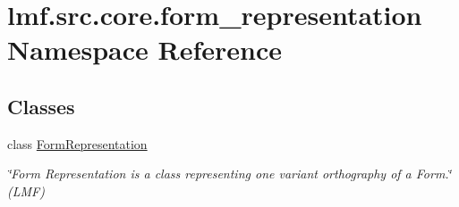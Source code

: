 \hypertarget{namespacelmf_1_1src_1_1core_1_1form__representation}{\section{lmf.\+src.\+core.\+form\+\_\+representation Namespace Reference}
\label{namespacelmf_1_1src_1_1core_1_1form__representation}
}
\subsection*{Classes}
\begin{DoxyCompactItemize}
\item 
class \hyperlink{classlmf_1_1src_1_1core_1_1form__representation_1_1_form_representation}{Form\+Representation}
\begin{DoxyCompactList}\small\item\em \char`\"{}\+Form Representation is a class representing one variant orthography of a Form.\char`\"{} (L\+M\+F) \end{DoxyCompactList}\end{DoxyCompactItemize}
